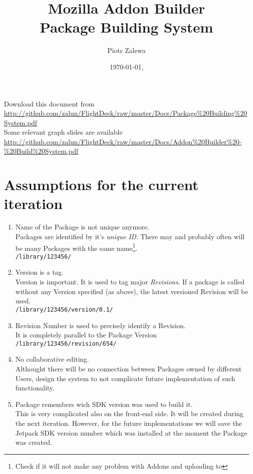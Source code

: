 \documentclass[10pt]{article}
\title{Mozilla Addon Builder\\ Package Building System}
\author{Piotr Zalewa}
\date{\today, \version}
\begin{document}
\maketitle

{\scriptsize
	\noindent Download this document from \\
\url{http://github.com/zalun/FlightDeck/raw/master/Docs/Package%20Building\%20System.pdf}\\
}{\scriptsize
	\noindent Some relevant graph slides are available \\
	\url{http://github.com/zalun/FlightDeck/raw/master/Docs/Addon%20Builder%20-%20Build%20System.pdf}
}

\section{Assumptions for the current iteration}

	\begin{enumerate}
		\item{Name of the Package is not unique anymore.\\
			Packages are identified by it's {\em unique ID}. There may and probably often will be many
			Packages with the same name\footnote{Check if it will not make any problem with Addons and 
			uploading to \amo}.\\
			{\tt /library/123456/}}
		\item{Version is a tag.\\
			Version is important. It is used to tag major {\em Revisions}. If a package is called without any
			Version specified (as above), the latest versioned Revision will be used.\\
			{\tt /library/123456/version/0.1/}}
		\item{Revision Number is used to precisely identify a Revision.\\
			It is completely parallel to the Package Version\\
			{\tt /library/123456/revision/654/}}
		\item{No collaborative editing.\\
			Althought there will be no connection between Packages owned by different Users, design the 
			system to not complicate future implementation of such functionality.}
		\item{Package remembers wich SDK version was used to build it.\\
			This is very complicated also on the front-end side. It will be created during the next
			iteration. However, for the future implementations we will save the Jetpack SDK version number 
			which was installed at the moment the Package was created.}
	\end{enumerate}
\end{document}
